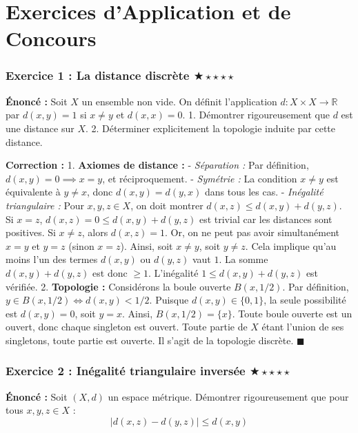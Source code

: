 \documentclass[11pt,a4paper]{article}
\begin{document}
\part{Exercices d'Application et de Concours}
\section*{Exercice 1 : La distance discrète \quad $\bigstar\star\star\star\star$}

\textbf{Énoncé :}
Soit $X$ un ensemble non vide. On définit l'application $d : X \times X \to \mathbb{R}$ par $d(x, y) = 1$ si $x \neq y$ et $d(x, x) = 0$.
1. Démontrer rigoureusement que $d$ est une distance sur $X$.
2. Déterminer explicitement la topologie induite par cette distance.

\textbf{Correction :}
1. \textbf{Axiomes de distance :}
   - \textit{Séparation :} Par définition, $d(x,y)=0 \implies x=y$, et réciproquement.
   - \textit{Symétrie :} La condition $x \neq y$ est équivalente à $y \neq x$, donc $d(x,y)=d(y,x)$ dans tous les cas.
   - \textit{Inégalité triangulaire :} Pour $x, y, z \in X$, on doit montrer $d(x, z) \le d(x, y) + d(y, z)$.
     Si $x=z$, $d(x,z)=0 \le d(x,y)+d(y,z)$ est trivial car les distances sont positives.
     Si $x \neq z$, alors $d(x,z)=1$. Or, on ne peut pas avoir simultanément $x=y$ et $y=z$ (sinon $x=z$). Ainsi, soit $x \neq y$, soit $y \neq z$. Cela implique qu'au moins l'un des termes $d(x,y)$ ou $d(y,z)$ vaut $1$. La somme $d(x,y)+d(y,z)$ est donc $\ge 1$. L'inégalité $1 \le d(x,y)+d(y,z)$ est vérifiée.
2. \textbf{Topologie :}
   Considérons la boule ouverte $B(x, 1/2)$. Par définition, $y \in B(x, 1/2) \iff d(x,y) < 1/2$.
   Puisque $d(x,y) \in \{0, 1\}$, la seule possibilité est $d(x,y)=0$, soit $y=x$.
   Ainsi, $B(x, 1/2) = \{x\}$. Toute boule ouverte est un ouvert, donc chaque singleton est ouvert.
   Toute partie de $X$ étant l'union de ses singletons, toute partie est ouverte. Il s'agit de la topologie discrète. $\blacksquare$


\section*{Exercice 2 : Inégalité triangulaire inversée \quad $\bigstar\star\star\star\star$}

\textbf{Énoncé :}
Soit $(X, d)$ un espace métrique. Démontrer rigoureusement que pour tous $x, y, z \in X$ :
$$ |d(x, z) - d(y, z)| \le d(x, y) $$
\end{document}
